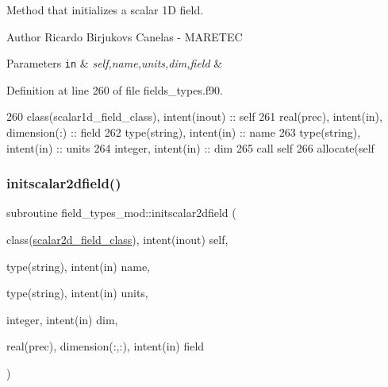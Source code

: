 Method that initializes a scalar 1D field. 

\begin{DoxyAuthor}{Author}
Ricardo Birjukovs Canelas -\/ M\+A\+R\+E\+T\+EC 
\end{DoxyAuthor}

\begin{DoxyParams}[1]{Parameters}
\mbox{\tt in}  & {\em self,name,units,dim,field} & \\
\hline
\end{DoxyParams}


Definition at line 260 of file fields\+\_\+types.\+f90.


\begin{DoxyCode}
260     \textcolor{keywordtype}{class}(scalar1d\_field\_class), \textcolor{keywordtype}{intent(inout)} :: self
261     \textcolor{keywordtype}{real(prec)}, \textcolor{keywordtype}{intent(in)}, \textcolor{keywordtype}{dimension(:)} :: field
262     \textcolor{keywordtype}{type}(string), \textcolor{keywordtype}{intent(in)} :: name
263     \textcolor{keywordtype}{type}(string), \textcolor{keywordtype}{intent(in)} :: units
264     \textcolor{keywordtype}{integer}, \textcolor{keywordtype}{intent(in)} :: dim
265     \textcolor{keyword}{call }self%
266     \textcolor{keyword}{allocate}(self%
\end{DoxyCode}
\mbox{\label{namespacefield__types__mod_af0bade94ad526899be6a55a81a407231}} 
\subsubsection{\texorpdfstring{initscalar2dfield()}{initscalar2dfield()}}
{\footnotesize\ttfamily subroutine field\+\_\+types\+\_\+mod\+::initscalar2dfield (\begin{DoxyParamCaption}\item[{class(\mbox{\hyperlink{structfield__types__mod_1_1scalar2d__field__class}{scalar2d\+\_\+field\+\_\+class}}), intent(inout)}]{self,  }\item[{type(string), intent(in)}]{name,  }\item[{type(string), intent(in)}]{units,  }\item[{integer, intent(in)}]{dim,  }\item[{real(prec), dimension(\+:,\+:), intent(in)}]{field }\end{DoxyParamCaption})\hspace{0.3cm}{\ttfamily [private]}}



